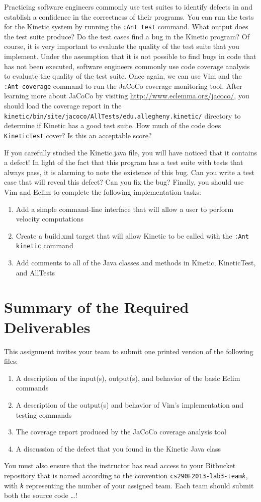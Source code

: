 Practicing software engineers commonly use test suites to identify defects in and establish a confidence in the
correctness of their programs.  You can run the tests for the Kinetic system by running the {\tt :Ant test} command.
What output does the test suite produce?  Do the test cases find a bug in the Kinetic program?  Of course, it is very
important to evaluate the quality of the test suite that you implement.  Under the assumption that it is not possible to
find bugs in code that has not been executed, software engineers commonly use code coverage analysis to evaluate the
quality of the test suite.  Once again, we can use Vim and the {\tt :Ant coverage} command to run the JaCoCo coverage
monitoring tool.  After learning more about JaCoCo by visiting \url{http://www.eclemma.org/jacoco/}, you should load the
coverage report in the {\tt kinetic/bin/site/jacoco/AllTests/edu.allegheny.kinetic/} directory to determine if Kinetic
has a good test suite.  How much of the code does {\tt KineticTest} cover?  Is this an acceptable score?

If you carefully studied the Kinetic.java file, you will have noticed that it contains a defect! In light of the fact
that this program has a test suite with tests that always pass, it is alarming to note the existence of this bug. 
Can you write a test case that will reveal this defect? Can you fix the bug?  Finally, you should use Vim and Eclim to
complete the following implementation tasks:

\vspace*{-.1in}
\begin{enumerate}
	\item Add a simple command-line interface that will allow a user to perform velocity computations
	\item Create a build.xml target that will allow Kinetic to be called with the {\tt :Ant kinetic} command
	\item Add comments to all of the Java classes and methods in Kinetic, KineticTest, and AllTests
\end{enumerate}

\section*{Summary of the Required Deliverables}

This assignment invites your team to submit one printed version of the following files:

\begin{enumerate}
	
	\item A description of the input(s), output(s), and behavior of the basic Eclim commands 
	\item A description of the output(s) and behavior of Vim's implementation and testing commands
	\item The coverage report produced by the JaCoCo coverage analysis tool
	\item A discussion of the defect that you found in the Kinetic Java class

\end{enumerate}

You must also ensure that the instructor has read access to your Bitbucket repository that is named according to the
convention {\tt cs290F2013-lab3-team{\em k}}, with {\tt {\em k}} representing the number of your assigned team. 
Each team should submit both the source code \ldots !


